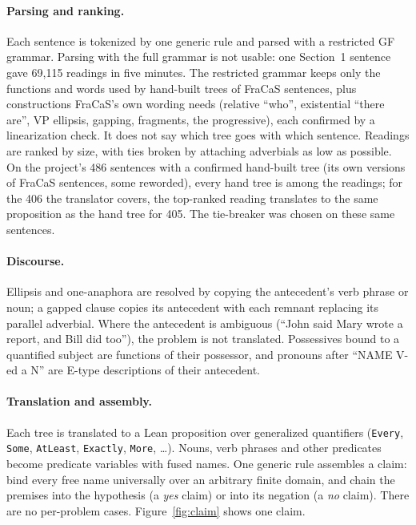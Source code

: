 \documentclass[11pt]{article}
\newcommand{\yes}{\textit{yes}}
\newcommand{\no}{\textit{no}}
\newcommand{\nm}[1]{\texttt{#1}}
\begin{document}
\paragraph{Parsing and ranking.} Each sentence is tokenized by one
generic rule and parsed with a restricted GF grammar. Parsing with the
full grammar is not usable: one Section~1 sentence gave 69,115 readings
in five minutes. The restricted grammar keeps only the functions and
words used by hand-built trees of FraCaS sentences, plus constructions
FraCaS's own wording needs (relative ``who'', existential ``there
are'', VP ellipsis, gapping, fragments, the progressive), each confirmed
by a linearization check. It does not say which tree goes with which
sentence. Readings are ranked by size, with ties broken by attaching
adverbials as low as possible. On the project's 486 sentences with a confirmed hand-built
tree (its own versions of FraCaS sentences, some reworded), every hand
tree is among the readings; for the 406 the translator covers, the
top-ranked reading translates to the same proposition as the hand tree
for 405. The tie-breaker was chosen on these same sentences.

\paragraph{Discourse.} Ellipsis and one-anaphora are resolved by copying
the antecedent's verb phrase or noun; a gapped clause copies its
antecedent with each remnant replacing its parallel adverbial. Where the
antecedent is ambiguous (``John said Mary wrote a report, and Bill did
too''), the problem is not translated. Possessives bound to a quantified
subject are functions of their possessor, and pronouns after ``NAME
V-ed a N'' are E-type descriptions of their antecedent.

\paragraph{Translation and assembly.} Each tree is translated to a Lean
proposition over generalized quantifiers (\nm{Every}, \nm{Some},
\nm{AtLeast}, \nm{Exactly}, \nm{More}, \ldots). Nouns, verb phrases and
other predicates become predicate variables with fused names. One
generic rule assembles a claim: bind every free name universally over
an arbitrary finite domain, and chain the premises into the hypothesis
(a \yes{} claim) or into its negation (a \no{} claim). There are no
per-problem cases. Figure~\ref{fig:claim} shows one claim.
\end{document}
